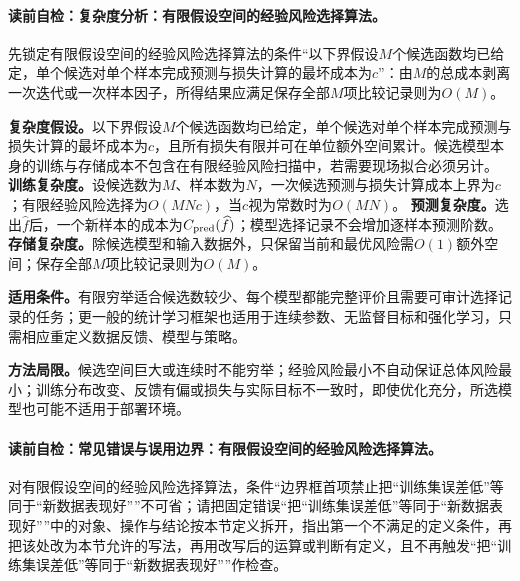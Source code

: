 \paragraph{读前自检：复杂度分析：有限假设空间的经验风险选择算法。}先锁定有限假设空间的经验风险选择算法的条件“以下界假设$M$个候选函数均已给定，单个候选对单个样本完成预测与损失计算的最坏成本为$c$”：由$M$的总成本剥离一次迭代或一次样本因子，所得结果应满足保存全部$M$项比较记录则为$O(M)$。\par

\begin{complexitybox}
\textbf{复杂度假设。}以下界假设$M$个候选函数均已给定，单个候选对单个样本完成预测与损失计算的最坏成本为$c$，且所有损失有限并可在单位额外空间累计。候选模型本身的训练与存储成本不包含在有限经验风险扫描中，若需要现场拟合必须另计。
\label{schema:V1-C09:CH-26}
\textbf{训练复杂度。}设候选数为$M$、样本数为$N$，一次候选预测与损失计算成本上界为$c$；有限经验风险选择为$O(MNc)$，当$c$视为常数时为$O(MN)$。
\label{schema:V1-C09:CH-27}
\textbf{预测复杂度。}选出$\widehat f$后，一个新样本的成本为$C_{\rm pred}(\widehat f)$；模型选择记录不会增加逐样本预测阶数。\textbf{存储复杂度。}除候选模型和输入数据外，只保留当前和最优风险需$O(1)$额外空间；保存全部$M$项比较记录则为$O(M)$。
\end{complexitybox}

\begin{applicabilitybox}\label{schema:V1-C09:CH-28}
\textbf{适用条件。}有限穷举适合候选数较少、每个模型都能完整评价且需要可审计选择记录的任务；更一般的统计学习框架也适用于连续参数、无监督目标和强化学习，只需相应重定义数据反馈、模型与策略。\par
{}\label{schema:V1-C09:CH-29}
\textbf{方法局限。}候选空间巨大或连续时不能穷举；经验风险最小不自动保证总体风险最小；训练分布改变、反馈有偏或损失与实际目标不一致时，即使优化充分，所选模型也可能不适用于部署环境。
\end{applicabilitybox}

\paragraph{读前自检：常见错误与误用边界：有限假设空间的经验风险选择算法。}对有限假设空间的经验风险选择算法，条件“边界框首项禁止把“训练集误差低”等同于“新数据表现好””不可省；请把固定错误“把“训练集误差低”等同于“新数据表现好””中的对象、操作与结论按本节定义拆开，指出第一个不满足的定义条件，再把该处改为本节允许的写法，再用改写后的运算或判断有定义，且不再触发“把“训练集误差低”等同于“新数据表现好””作检查。\par

